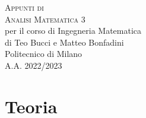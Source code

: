 \documentclass[10pt,a4paper,twoside]{book}
\begin{document}
\frontmatter

\pagestyle{empty}


\hypertarget{mytitlepage}{} %

\vspace*{\fill}

\begin{center}
	{\large \textsc{Appunti di}}\\
	\vspace*{0.4cm}
	{\Huge \textsc{Analisi Matematica 3}}\\
	\vspace*{1cm}
	{\large per il corso di Ingegneria Matematica}\\
	\vspace*{0.4cm}
	{\large {di Teo Bucci e Matteo Bonfadini}}\\
	\vspace*{1cm}
	Politecnico di Milano\\
	A.A. 2022/2023
\end{center}
\vspace*{\fill}
\clearpage


\hypertarget{mycopyright}{} %

\clearpage


% 


\cleardoublepage
\pagestyle{toc}
\hypertarget{mytoc}{} %
\bookmark[dest=mytoc,level=chapter]{\contentsname} %
\tableofcontents
\cleardoublepage


\pagestyle{fancy}
\mainmatter

\part{Teoria}
 \cleardoublepage

\end{document}
